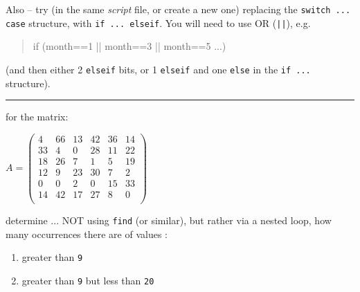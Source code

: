 \documentclass{tufte-book} %
\newenvironment{docspec}{\begin{quotation}\ttfamily\parskip0pt\parindent0pt\ignorespaces}{\end{quotation}}
\begin{document}
Also -- try (in the same \textit{script} file, or create a new one) replacing the \texttt{switch ... case} structure, with \texttt{if ... elseif}. You will need to use OR (\texttt{||}), e.g. 
\begin{docspec}
if (month==1 || month==3 || month==5 ...)
\end{docspec}
(and then either 2 \texttt{elseif} bits, or 1 \texttt{elseif} and one \texttt{else} in the \texttt{if ...} structure).

\vspace{1mm}
\noindent\rule{4cm}{0.5pt}
\vspace{-2mm}

\vspace{20mm}

\pagebreak

 for the matrix:

\vspace{4mm}
\(A=\begin{pmatrix}4 & 66 & 13 & 42 & 36 & 14 \\
33 & 4 & 0 & 28 & 11 & 22 \\
18 & 26 & 7 & 1 & 5 & 19 \\
12 & 9 & 23 & 30 & 7 & 2 \\
0 & 0 & 2 & 0 & 15 & 33 \\
14 & 42 & 17 & 27 & 8 & 0 \\
\end{pmatrix}\)
\vspace{4mm}

\noindent determine ... NOT using \texttt{find} (or similar), but rather via a nested loop, how many occurrences there are of values
:
\vspace{-0mm}
\begin{enumerate}[noitemsep]
\item greater than \texttt{9}
\item greater than \texttt{9} but less than \texttt{20}
\end{enumerate}
\vspace{-0mm}
\end{document}
